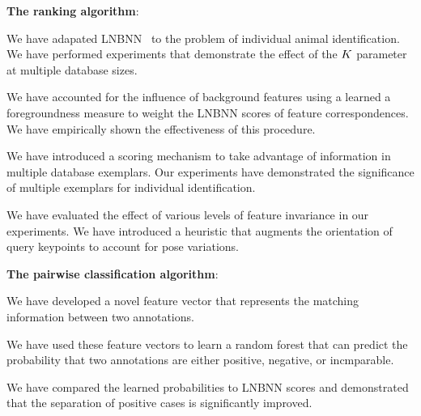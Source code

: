     \begin{itemln}
    \item \textbf{The ranking algorithm}:
        \begin{itemln}
        \item We have adapated LNBNN~\cite{mccann_local_2012} to the problem of individual animal
            identification.
            We have performed experiments that demonstrate the effect of the $K$ parameter at multiple
            database sizes.

        \item We have accounted for the influence of background features using a learned a foregroundness
            measure to weight the LNBNN scores of feature correspondences.
            We have empirically shown the effectiveness of this procedure.

        \item We have introduced a \name{} scoring mechanism to take advantage of information in multiple
            database exemplars.
            Our experiments have demonstrated the significance of multiple exemplars for individual
            identification.

        \item We have evaluated the effect of various levels of feature invariance in our experiments.
            We have introduced a heuristic that augments the orientation of query keypoints to account for
            pose variations.
        \end{itemln}

    \item \textbf{The pairwise classification algorithm}:
        \begin{itemln}

        \item We have developed a novel feature vector that represents the matching information between two
            annotations.

        \item We have used these feature vectors to learn a random forest that can predict the probability
            that two annotations are either positive, negative, or incmparable.

        \item We have compared the learned probabilities to LNBNN scores and demonstrated that the separation of
          positive cases is significantly improved.
        \end{itemln}



\end{itemln}
